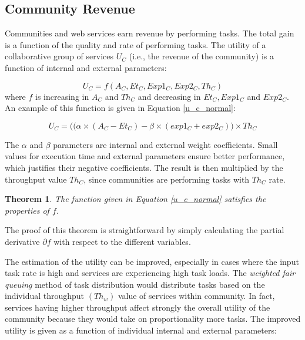 \documentclass[11pt,onecolumn]{IEEEtran}
\newtheorem{theorem}{Theorem}
\begin{document}
\subsection{Community Revenue}

Communities and web services earn revenue by performing tasks. The total gain is a function of the quality and rate of performing tasks. The utility of a collaborative group of services $U_{C}$ (i.e., the revenue of the community) is a function of internal and external parameters:

\begin{equation}\label{u_c_general}
U_{C} = f(A_{C}, Et_{C}, Exp1_{C}, Exp2_{C}, Th_{C})
\end{equation}
%
where $f$ is increasing in $A_{C}$ and $Th_{C}$ and decreasing in $Et_{C}, Exp1_{C}$ and $Exp2_{C}$. An example of this function is given in Equation \ref{u_c_normal}:

\begin{equation}\label{u_c_normal}
U_{C} = \big((\alpha \times (A_{C} - Et_{C}) - \beta \times (exp1_{C} + exp2_{C})\big) \times Th_{C}
\end{equation}

The $\alpha$ and $\beta$ parameters are internal and external weight coefficients. Small values for execution time and external parameters ensure better performance, which justifies their negative coefficients. The result is then multiplied by the throughput value $Th_{C}$, since communities are performing tasks with $Th_{C}$ rate.

\begin{theorem}
The function given in Equation \ref{u_c_normal} satisfies the properties of $f$.
\end{theorem} 

The proof of this theorem is straightforward by simply calculating the partial derivative $\partial f$ with respect to the different variables.


The estimation of the utility can be improved, especially in cases where the input task rate is high and services are experiencing high task loads. The \emph{weighted fair queuing} method of task distribution would distribute tasks based on the individual throughput $(Th_{w})$ value of services within community. In fact, services having higher throughput affect strongly the overall utility of the community because they would take on proportionality more tasks. The improved utility is given as a function of individual internal and external parameters:
\end{document}
